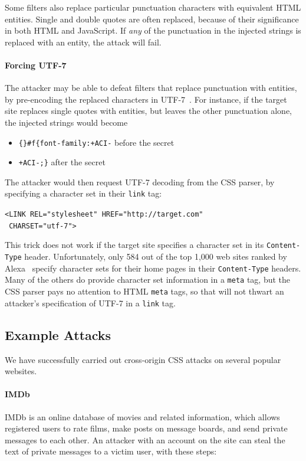 \documentclass{acm_proc_article-sp}
\begin{document}
Some filters also replace particular punctuation characters with
equivalent HTML entities.  Single and double quotes are often
replaced, because of their significance in both HTML and JavaScript.
If \emph{any} of the punctuation in the injected strings is replaced
with an entity, the attack will fail.

\paragraph{Forcing UTF-7}
The attacker may be able to defeat filters that replace punctuation
with entities, by pre-encoding the replaced characters in
UTF-7~\cite{utf7}.  For instance, if the target site replaces single
quotes with entities, but leaves the other punctuation alone, the
injected strings would become
\begin{itemize}
\item \verb|{}#f{font-family:+ACI-| before the secret
\item \verb|+ACI-;}| after the secret
\end{itemize}
The attacker would then request UTF-7 decoding from the CSS parser,
by specifying a character set in their \verb|link| tag:

\verb|<LINK REL="stylesheet" HREF="http://target.com"|\\
\verb| CHARSET="utf-7">|

This trick does not work if the target site specifies a character set
in its \texttt{Content-Type} header.  Unfortunately, only 584 out of
the top 1,000 web sites ranked by Alexa~\cite{alexa} specify character
sets for their home pages in their \texttt{Content-Type} headers.
Many of the others do provide character set information in a
\verb|meta| tag, but the CSS parser pays no attention to HTML
\verb|meta| tags, so that will not thwart an attacker's specification
of UTF-7 in a \verb|link| tag.

\subsection{Example Attacks} \label{sec:demos}
We have successfully carried out cross-origin CSS attacks on several
popular websites.

\paragraph{IMDb}
IMDb is an online database of movies and related information, which
allows registered users to rate films, make posts on message boards,
and send private messages to each other.  An attacker with an account
on the site can steal the text of private messages to a victim user,
with these steps:
\end{document}
